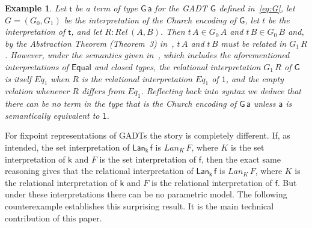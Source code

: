 \documentclass[submission,copyright,creativecommons]{eptcs}
\newtheorem{example}[thm]{Example}
\begin{document}
\begin{example}\label{ex:CE-par}
Let $\mathsf{t}$ be a term of type $\mathsf{G\,a}$ for the GADT
$\mathsf{G}$ defined in~\eqref{eq:G}, let $G = (G_0,G_1)$ be the
interpretation of the Church encoding of $\mathsf{G}$, let $t$ be the
interpretation of $\mathsf{t}$, and let $R :
\mathit{Rel}\,(A,B)$. Then $t\, A \in G_0\,A$ and $t\,B \in G_0\,B$
and, by the Abstraction Theorem (Theorem~3) in~\cite{atk12}, $t\,A$
and $t\,B$ must be related in $G_1\,R$. However, under the semantics
given in~\cite{atk12}, which includes the aforementioned
interpretations of $\mathsf{Equal}$ and closed types, the relational
interpretation $G_1\,R$ of $\mathsf{G}$ is itself $\mathit{Eq}_1$ when
$R$ is the relational interpretation $\mathit{Eq}_1$ of $\mathsf{1}$,
and the empty relation whenever $R$ differs from
$\mathit{Eq}_1$. Reflecting back into syntax we deduce that there can
be no term in the type that is the Church encoding of $\mathsf{G\,a}$
unless $\mathsf{a}$ is semantically equivalent to $\mathsf{1}$.
\end{example}

For fixpoint representations of GADTs the story is completely
different. If, as intended, the set interpretation of
$\mathsf{Lan_k\,f}$ is $\mathit{Lan}_K\,F$, where $K$ is the set
interpretation of $\mathsf{k}$ and $F$ is the set interpretation of
$\mathsf{f}$, then the exact same reasoning gives that the relational
interpretation of $\mathsf{Lan_k\,f}$ is $\mathit{Lan}_K\,F$, where
$K$ is the relational interpretation of $\mathsf{k}$ and $F$ is the
relational interpretation of $\mathsf{f}$. But under these
interpretations there can be no parametric model. The following
counterexample establishes this surprising result. It is the main
technical contribution of this paper.
\end{document}
